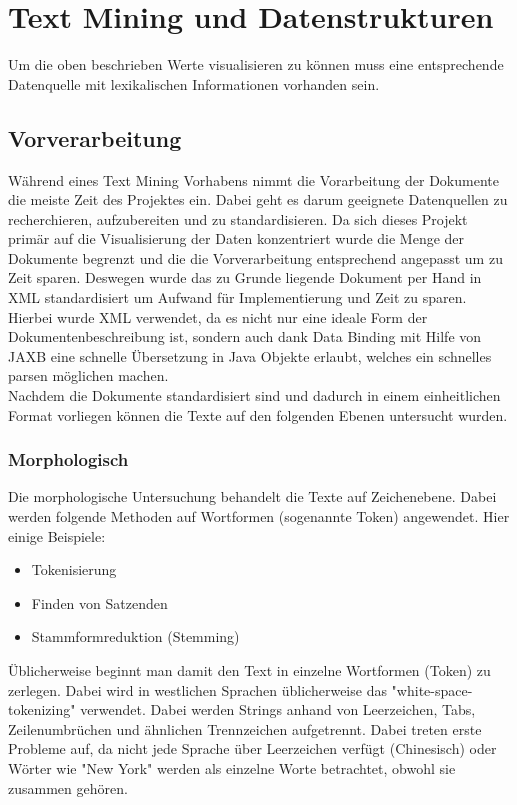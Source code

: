 \section{Text Mining und Datenstrukturen}
Um die oben beschrieben Werte visualisieren zu können muss eine entsprechende Datenquelle mit lexikalischen Informationen vorhanden sein.

\subsection{Vorverarbeitung}
Während eines Text Mining Vorhabens nimmt die Vorarbeitung der Dokumente die meiste Zeit des Projektes ein. Dabei geht es darum geeignete Datenquellen zu recherchieren, aufzubereiten und zu standardisieren. Da sich dieses Projekt primär auf die Visualisierung der Daten konzentriert wurde die Menge der Dokumente begrenzt und die die Vorverarbeitung entsprechend angepasst um zu Zeit sparen. Deswegen wurde das zu Grunde liegende Dokument per Hand in XML standardisiert um Aufwand für Implementierung und Zeit zu sparen. Hierbei wurde XML verwendet, da es nicht nur eine ideale Form der Dokumentenbeschreibung ist, sondern auch dank Data Binding mit Hilfe von JAXB eine schnelle Übersetzung in Java Objekte erlaubt, welches ein schnelles parsen möglichen machen.\\

Nachdem die Dokumente standardisiert sind und dadurch in einem einheitlichen Format vorliegen können die Texte auf den folgenden Ebenen untersucht wurden.

\subsubsection{Morphologisch}
Die morphologische Untersuchung behandelt die Texte auf Zeichenebene. Dabei werden folgende Methoden auf Wortformen (sogenannte Token) angewendet. Hier einige Beispiele:\\

\begin{itemize}
\item Tokenisierung
\item Finden von Satzenden
\item Stammformreduktion (Stemming)
\end{itemize}

Üblicherweise beginnt man damit den Text in einzelne Wortformen (Token) zu zerlegen. Dabei wird in westlichen Sprachen üblicherweise das "white-space-tokenizing" verwendet. Dabei werden Strings anhand von Leerzeichen, Tabs, Zeilenumbrüchen und ähnlichen Trennzeichen aufgetrennt. Dabei treten erste Probleme auf, da nicht jede Sprache über Leerzeichen verfügt (Chinesisch) oder Wörter wie "New York" werden als einzelne Worte betrachtet, obwohl sie zusammen gehören.\\

